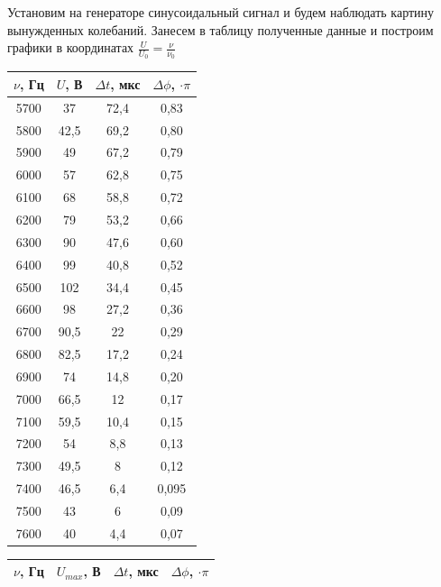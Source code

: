 \documentclass[a4paper, 12pt]{article}
\begin{document}
        Установим на генераторе синусоидальный сигнал и будем наблюдать картину вынужденных колебаний. Занесем в таблицу полученные данные и построим графики в координатах $\frac{U}{U_{0}} = \frac{\nu}{\nu_0}$
        \begin{table}[h]
            \centering
            \begin{tabular}{|c|c|c|c|}
                \hline
                $\nu$, Гц & $U$, В & $\Delta t$, мкс & $\Delta \phi$, $\cdot \pi$ \\ \hline
                5700 & 37 & 72,4 & 0,83 \\ \hline
                5800 & 42,5 & 69,2 & 0,80 \\ \hline
                5900 & 49 & 67,2 & 0,79 \\ \hline
                6000 & 57 & 62,8 & 0,75 \\ \hline
                6100 & 68 & 58,8 & 0,72 \\ \hline
                6200 & 79 & 53,2 & 0,66 \\ \hline
                6300 & 90 & 47,6 & 0,60 \\ \hline
                6400 & 99 & 40,8 & 0,52 \\ \hline
                6500 & 102 & 34,4 & 0,45 \\ \hline
                6600 & 98 & 27,2 & 0,36 \\ \hline
                6700 & 90,5 & 22 & 0,29 \\ \hline
                6800 & 82,5 & 17,2 & 0,24 \\ \hline
                6900 & 74 & 14,8 & 0,20 \\ \hline
                7000 & 66,5 & 12 & 0,17 \\ \hline
                7100 & 59,5 & 10,4& 0,15 \\ \hline
                7200 & 54 & 8,8 & 0,13 \\ \hline
                7300 & 49,5 & 8 & 0,12 \\ \hline
                7400 & 46,5 & 6,4 & 0,095 \\ \hline
                7500 & 43 & 6 & 0,09 \\ \hline
                7600 & 40 & 4,4 & 0,07 \\ \hline
            \end{tabular}
            \hspace{.06\textwidth}
            \begin{tabular}{|c|c|c|c|}
                \hline
                $\nu$, Гц & $U_{max}$, В & $\Delta t$, мкс & $\Delta \phi$, $\cdot \pi$ \\ \hline

\end{tabular}
\end{table}
\end{document}
